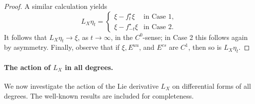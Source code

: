 \documentclass[11pt,letterpaper,reqno,abstract=true]{scrartcl}
\theoremstyle{plain}                              %
\theoremstyle{definition}                         %
\theoremstyle{remark}                             %
\begin{document}
\begin{proof}
   A similar calculation yields
%
   \begin{displaymath}
     L_X \eta_t =
     \begin{cases}
       \xi - f_t^\star \xi & \text{in Case 1}, \\
       \xi - f_{-t}^\star \xi & \text{in Case 2}.
     \end{cases}
   \end{displaymath}
%
   It follows that $L_X \eta_t \to \xi$, as $t \to \infty$, in the
   $C^0$-sense; in Case 2 this follows again by asymmetry. Finally,
   observe that if $\xi, E^{uu}$, and $E^{cs}$ are $C^1$, then so is $L_X \eta_t$.
%
 \end{proof}



 \paragraph{The action of $L_X$ in all degrees.} We now investigate
 the action of the Lie derivative $L_X$ on differential forms of all
 degrees. The well-known results are included for completeness.
\end{document}
